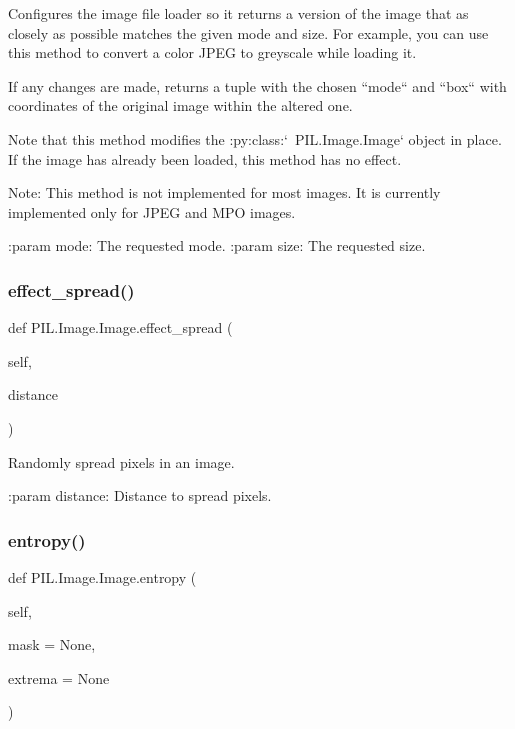 \begin{DoxyVerb}Configures the image file loader so it returns a version of the
image that as closely as possible matches the given mode and
size. For example, you can use this method to convert a color
JPEG to greyscale while loading it.

If any changes are made, returns a tuple with the chosen ``mode`` and
``box`` with coordinates of the original image within the altered one.

Note that this method modifies the :py:class:`~PIL.Image.Image` object
in place. If the image has already been loaded, this method has no
effect.

Note: This method is not implemented for most images. It is
currently implemented only for JPEG and MPO images.

:param mode: The requested mode.
:param size: The requested size.
\end{DoxyVerb}
 \mbox{\label{classPIL_1_1Image_1_1Image_a1b056ef9031c313a94225f4272ee1867}} 
\subsubsection{\texorpdfstring{effect\+\_\+spread()}{effect\_spread()}}
{\footnotesize\ttfamily def P\+I\+L.\+Image.\+Image.\+effect\+\_\+spread (\begin{DoxyParamCaption}\item[{}]{self,  }\item[{}]{distance }\end{DoxyParamCaption})}

\begin{DoxyVerb}Randomly spread pixels in an image.

:param distance: Distance to spread pixels.
\end{DoxyVerb}
 \mbox{\label{classPIL_1_1Image_1_1Image_aca9ca36ba53c98fcdacf785b3a50afb3}} 
\subsubsection{\texorpdfstring{entropy()}{entropy()}}
{\footnotesize\ttfamily def P\+I\+L.\+Image.\+Image.\+entropy (\begin{DoxyParamCaption}\item[{}]{self,  }\item[{}]{mask = {\ttfamily None},  }\item[{}]{extrema = {\ttfamily None} }\end{DoxyParamCaption})}

